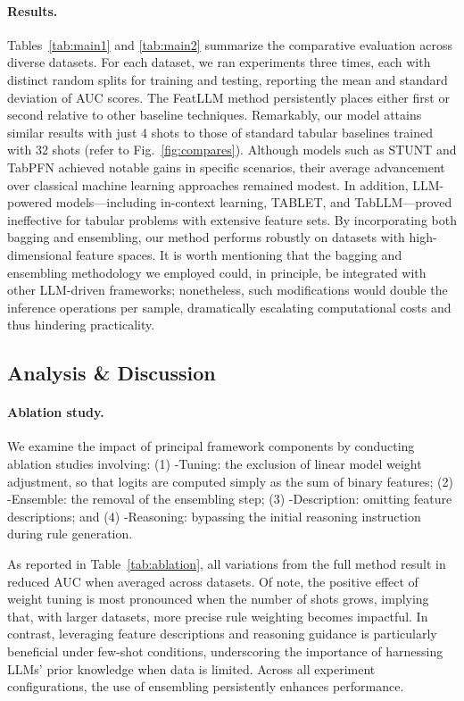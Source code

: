 \vspace*{-0.12in}
\paragraph{Results.}
Tables~\ref{tab:main1} and \ref{tab:main2} summarize the comparative evaluation across diverse datasets. For each dataset, we ran experiments three times, each with distinct random splits for training and testing, reporting the mean and standard deviation of AUC scores. The \textsf{FeatLLM} method persistently places either first or second relative to other baseline techniques. Remarkably, our model attains similar results with just 4 shots to those of standard tabular baselines trained with 32 shots (refer to Fig.~\ref{fig:compares}). Although models such as STUNT and TabPFN achieved notable gains in specific scenarios, their average advancement over classical machine learning approaches remained modest. In addition, LLM-powered models—including in-context learning, TABLET, and TabLLM—proved ineffective for tabular problems with extensive feature sets. By incorporating both bagging and ensembling, our method performs robustly on datasets with high-dimensional feature spaces. It is worth mentioning that the bagging and ensembling methodology we employed could, in principle, be integrated with other LLM-driven frameworks; nonetheless, such modifications would double the inference operations per sample, dramatically escalating computational costs and thus hindering practicality.

\subsection{Analysis \& Discussion}
\label{sec:analysis}
\paragraph{Ablation study.} We examine the impact of principal framework components by conducting ablation studies involving: (1) \textsf{-Tuning}: the exclusion of linear model weight adjustment, so that logits are computed simply as the sum of binary features; (2) \textsf{-Ensemble}: the removal of the ensembling step; (3) \textsf{-Description}: omitting feature descriptions; and (4) \textsf{-Reasoning}: bypassing the initial reasoning instruction during rule generation.

As reported in Table~\ref{tab:ablation}, all variations from the full method result in reduced AUC when averaged across datasets. Of note, the positive effect of weight tuning is most pronounced when the number of shots grows, implying that, with larger datasets, more precise rule weighting becomes impactful. In contrast, leveraging feature descriptions and reasoning guidance is particularly beneficial under few-shot conditions, underscoring the importance of harnessing LLMs' prior knowledge when data is limited. Across all experiment configurations, the use of ensembling persistently enhances performance.

